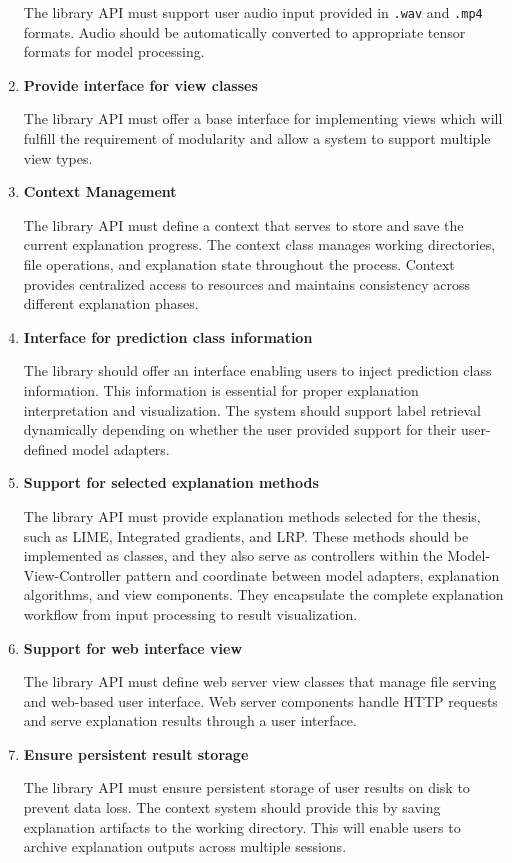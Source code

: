 \documentclass[
    bindingoffset=5mm,  %
    footnoteindent=3mm, %
    hyphenation=true    %
]{src/wut-thesis}
\begin{document}
\begin{enumerate}[itemsep=1\baselineskip]
        The library API must support user audio input provided in \texttt{.wav} and \texttt{.mp4} formats.
    Audio should be automatically converted to appropriate tensor formats for model processing.

    \item \textbf{Provide interface for view classes}

        The library API must offer a base interface for implementing views which will fulfill
    the requirement of modularity and allow a system to support multiple view types.

    \item \textbf{Context Management}

        The library API must define a context that serves to store and save the current explanation progress.
    The context class manages working directories, file operations, and explanation state throughout the process.
    Context provides centralized access to resources and maintains consistency across different explanation phases.

    \item \textbf{Interface for prediction class information}

        The library should offer an interface enabling users to inject prediction class information.
    This information is essential for proper explanation interpretation and visualization.
    The system should support label retrieval dynamically depending on whether the user provided
    support for their user-defined model adapters.

    \item \textbf{Support for selected explanation methods}

        The library API must provide explanation methods selected for the thesis, such as LIME, Integrated gradients, and LRP.
    These methods should be implemented as classes, and they also serve as controllers within
    the Model-View-Controller pattern and coordinate between model adapters, explanation algorithms, and view components. They encapsulate the complete explanation workflow from input processing to result visualization.

    \item \textbf{Support for web interface view}

        The library API must define web server view classes that manage file serving and web-based user interface.
    Web server components handle HTTP requests and serve explanation results through a user interface.

    \item \textbf{Ensure persistent result storage}

        The library API must ensure persistent storage of user results on disk to prevent
    data loss. The context system should provide this by saving explanation artifacts to
    the working directory. This will enable users to archive explanation outputs across 
    multiple sessions.
    
    \end{enumerate}
\end{document}
